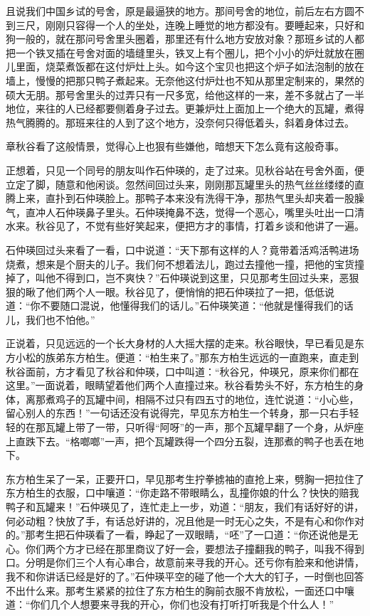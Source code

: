 \documentclass[12pt,UTF8]{ctexbook}
\begin{document}
{{{且说我们中国乡试的号舍，原是最逼狭的地方。那间号舍的地位，前后左右方圆不到三尺，刚刚只容得一个人的坐处，连晚上睡觉的地方都没有。要睡起来，只好和狗一般的，就在那问号舍里头圈着，那里还有什么地方安放对象？那班乡试的人都把一个铁叉插在号舍对面的墙缝里头，铁叉上有个圈儿，把个小小的炉灶就放在圈儿里面，烧菜煮饭都在这付炉灶上头。如今这个宝贝也把这个炉子如法泡制的放在墙上，慢慢的把那只鸭子煮起来。无奈他这付炉灶也不知从那里定制来的，果然的硕大无朋。那号舍里头的过弄只有一尺多宽，给他这样的一来，差不多就占了一半地位，来往的人已经都要侧着身子过去。更兼炉灶上面加上一个绝大的瓦罐，煮得热气腾腾的。那班来往的人到了这个地方，没奈何只得低着头，斜着身体过去。

章秋谷看了这般情景，觉得心上也狠有些嫌他，暗想天下怎么竟有这般奇事。

正想着，只见一个同号的朋友叫作石仲瑛的，走了过来。见秋谷站在号舍外面，便立定了脚，随意和他闲谈。忽然间回过头来，刚刚那瓦罐里头的热气丝丝缕缕的直腾上来，直扑到石仲瑛脸上。那鸭子本来没有洗得干净，那热气里头却夹着一股臊气，直冲人石仲瑛鼻子里头。石仲瑛掩鼻不迭，觉得一个恶心，嘴里头吐出一口清水来。秋谷见了，不觉有些好笑起来，便把方才的事情，打着乡谈和他讲了一遍。

石仲瑛回过头来看了一看，口中说道：“天下那有这样的人？竟带着活鸡活鸭进场烧煮，想来是个厨夫的儿子。我们何不想着法儿，跑过去撞他一撞，把他的宝货撞掉了，叫他不得到口，岂不爽快？”石仲瑛说到这里，只见那考生回过头来，恶狠狠的瞅了他们两个人一眼。秋谷见了，便悄悄的把石仲瑛拉了一把，低低说道：“你不要随口混说，他懂得我们的话儿。”石仲瑛笑道：“他就是懂得我们的话儿，我们也不怕他。”

正说着，只见远远的一个长大身材的人大摇大摆的走来。秋谷眼快，早已看见是东方小松的族弟东方柏生。便道：“柏生来了。”那东方柏生远远的一直跑来，直走到秋谷面前，方才看见了秋谷和仲瑛，口中叫道：“秋谷兄，仲瑛兄，原来你们都在这里。”一面说着，眼睛望着他们两个人直撞过来。秋谷看势头不好，东方柏生的身体，离那煮鸡子的瓦罐中间，相隔不过只有四五寸的地位，连忙说道：“小心些，留心别人的东西！”一句话还没有说得完，早见东方柏生一个转身，那一只右手轻轻的在那瓦罐上带了一带，只听得“阿呀”的一声，那个瓦罐早翻了一个身，从炉座上直跌下去。“格啷啷”一声，把个瓦罐跌得一个四分五裂，连那煮的鸭子也丢在地下。

东方柏生呆了一呆，正要开口，早见那考生拧拳掳袖的直抢上来，劈胸一把拉住了东方柏生的衣服，口中嚷道：“你走路不带眼睛么，乱撞你娘的什么？快快的赔我鸭子和瓦罐来！”石仲瑛见了，连忙走上一步，劝道：“朋友，我们有话好好的讲，何必动粗？快放了手，有话总好讲的，况且他是一时无心之失，不是有心和你作对的。”那考生把石仲瑛看了一看，睁起了一双眼睛，“呸”了一口道：“你还说他是无心。你们两个方才已经在那里商议了好一会，要想法子撞翻我的鸭子，叫我不得到口。分明是你们三个人有心串合，故意前来寻我的开心。还亏你有脸来和他讲情，我不和你讲话已经是好的了。”石仲瑛平空的碰了他一个大大的钉子，一时倒也回答不出什么来。那考生紧紧的拉住了东方柏生的胸前衣服不肯放松，一面还口中嚷道：“你们几个人想要来寻我的开心，你们也没有打听打听我是个什么人！”

}}}
\end{document}
